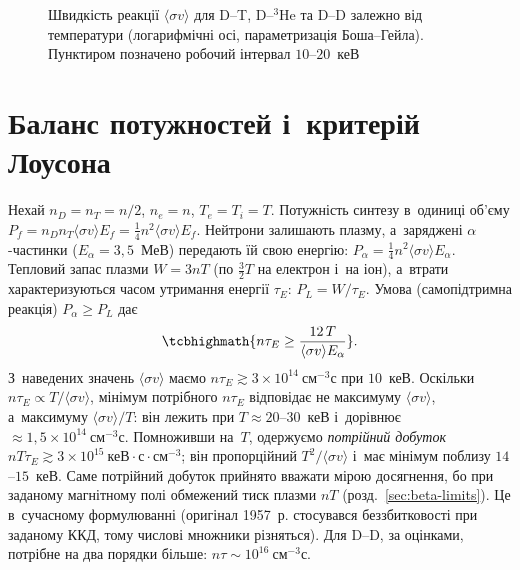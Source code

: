 \begin{figure}[ht]\centering
	\caption{Швидкість реакції $\langle\sigma v\rangle$ для D--T, D--$^3$He та D--D залежно від температури
	(логарифмічні осі, параметризація Боша--Гейла). Пунктиром позначено робочий інтервал $10$--$20$~кеВ}
	\label{fig:sigmav}
\end{figure}

\section{Баланс потужностей і~критерій Лоусона}

Нехай $n_D=n_T=n/2$, $n_e=n$, $T_e=T_i=T$. Потужність синтезу в~одиниці об'єму
$P_f=n_Dn_T\langle\sigma v\rangle E_f=\tfrac14n^2\langle\sigma v\rangle E_f$. Нейтрони
залишають плазму, а~заряджені $\alpha$-частинки ($E_\alpha=3{,}5$~МеВ) передають їй свою
енергію: $P_\alpha=\tfrac14n^2\langle\sigma v\rangle E_\alpha$. Тепловий запас плазми
$W=3nT$ (по $\tfrac32T$ на електрон і~на іон), а~втрати
характеризуються часом утримання енергії $\tau_E$: $P_L=W/\tau_E$. Умова
 (самопідтримна реакція) $P_\alpha\geq P_L$ дає
\begin{equation}\label{eq:lawson}
	\tcbhighmath{n\tau_E\geq\frac{12\,T}{\langle\sigma v\rangle E_\alpha}}.
\end{equation}
З~наведених значень $\langle\sigma v\rangle$ маємо $n\tau_E\gtrsim3\times10^{14}~\mathrm{см}^{-3}\mathrm{с}$
при $10$~кеВ. Оскільки $n\tau_E\propto T/\langle\sigma v\rangle$, мінімум потрібного $n\tau_E$
відповідає не максимуму $\langle\sigma v\rangle$, а~максимуму $\langle\sigma v\rangle/T$: він
лежить при $T\approx20$--$30$~кеВ і~дорівнює $\approx1{,}5\times10^{14}~\mathrm{см}^{-3}\mathrm{с}$.
Помноживши на~$T$, одержуємо \emph{потрійний добуток}
$nT\tau_E\gtrsim3\times10^{15}~\text{кеВ}\cdot\mathrm{с}\cdot\mathrm{см}^{-3}$; він пропорційний
$T^2/\langle\sigma v\rangle$ і~має мінімум поблизу $14$--$15$~кеВ. Саме потрійний добуток
прийнято вважати мірою досягнення, бо при заданому магнітному полі обмежений тиск плазми $nT$
(розд.~\ref{sec:beta-limits}). Це 
в~сучасному формулюванні (оригінал 1957~р. стосувався беззбитковості при заданому ККД,
тому числові множники різняться). Для D--D, за оцінками, потрібне на два порядки більше:
$n\tau\sim10^{16}~\mathrm{см}^{-3}\mathrm{с}$.

